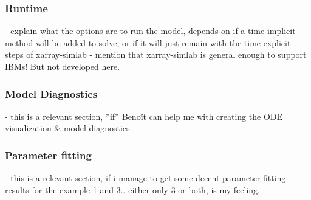 \documentclass[journal abbreviation, manuscript]{copernicus}
\begin{document}
\subsubsection{Runtime}
- explain what the options are to run the model, depends on if a time implicit method will be added to solve, or if it will just remain with the time explicit steps of xarray-simlab
- mention that xarray-simlab is general enough to support IBMs! But not developed here.

\subsubsection{Model Diagnostics}
- this is a relevant section, *if* Benoît can help me with creating the ODE visualization & model diagnostics.

\subsubsection{Parameter fitting}
- this is a relevant section, if i manage to get some decent parameter fitting results for the example 1 and 3.. either only 3 or both, is my feeling. 
\end{document}
